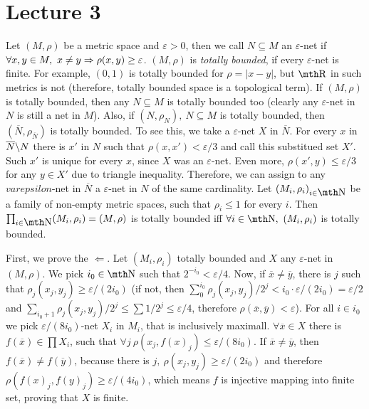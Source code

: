 \chapter{Lecture 3}

 Let $(M,\rho)$ be a metric space and 
$\varepsilon>0$, then we call $N\subseteq M$ an $\varepsilon$-net 
if $\forall x,y \in M,\ x\neq y \Rightarrow \rho(x,y) \geq \varepsilon$. 
$(M,\rho)$ is {\it totally bounded}, if every $\varepsilon$-net 
is finite. For example, $(0,1)$ is totally bounded for $\rho=|x-y|$,
but $\R$ in such metrics is not (therefore, totally bounded space 
is a topological term).
\smallskip
If $(M,\rho)$ is totally bounded, then any $N\subseteq M$ is totally 
bounded too (clearly any $\varepsilon$-net in $N$ is still a net in 
$M$). Also, if $(N,\rho_{N}),\ N\subseteq M$ is totally bounded,
then $(\overline N,\rho_{\overline N})$ is totally bounded. To see 
this, we take a $\varepsilon$-net $X$ in $\overline N$. For every 
$x$ in $\overline N \backslash N$ there is $x'$ in $N$ such that $\rho(x,x')
< \varepsilon/3$ and call this substitued set $X'$. Such $x'$ is 
unique for every $x$, since $X$ was an $\varepsilon$-net. Even 
more, $\rho(x',y)\leq \varepsilon/3$ for any $y\in X'$ due to triangle 
inequality. Therefore, we can assign to any $varepsilon$-net in 
$\overline N$ a $\varepsilon$-net in $N$ of the same cardinality.
\smallskip
Let $(M_i,\rho_i)_{i\in \N}$ be a family of non-empty metric spaces,
such that $\rho_i \leq 1$ for every $i$. Then $\prod_{i\in \N} 
(M_i,\rho_i) = (M,\rho)$ is totally bounded iff $\forall i\in \N,\ 
(M_i,\rho_i)$ is totally bounded.

First, we prove the $\Leftarrow$. Let $(M_i,\rho_i)$ totally bounded 
and $X$ any $\varepsilon$-net in $(M,\rho)$. We pick $i_0\in \N$ 
such that $2^{-i_0} < \varepsilon/4$. Now, if $\overline x \neq 
\overline y$, there is $j$ such that $\rho_j(x_j,y_j) \geq 
\varepsilon / (2i_0)$ (if not, then $\sum_0^{i_0} \rho_j(x_j,y_j)/
2^{j} < i_0 \cdot \varepsilon/(2i_0) = \varepsilon/2$ and 
$\sum_{i_0 +1} \rho_j(x_j,y_j) / 2^j \leq \sum 1/2^j \leq 
\varepsilon/4$, therefore $\rho(\overline x, \overline y) < 
\varepsilon$). For all $i\in i_0$ we pick $\varepsilon/(8i_0)$-net
$X_i$ in $M_i$, that is inclusively maximall. $\forall \overline x 
\in X$ there is $f(\overline x)\in \prod X_i$, such that $\forall j\ 
\rho(x_j, f(x)_j) \leq \varepsilon/(8i_0)$. 
If $\overline x\neq \overline y$, then $f(\overline x) \neq f(\overline 
y)$, because 
there is $j,\ \rho(x_j,y_j)\geq \varepsilon /(2i_0)$ and therefore 
$\rho(f(x)_j,f(y)_j) \geq \varepsilon /(4i_0)$, which means
$f$ is injective mapping into finite set, proving that $X$ is 
finite.

